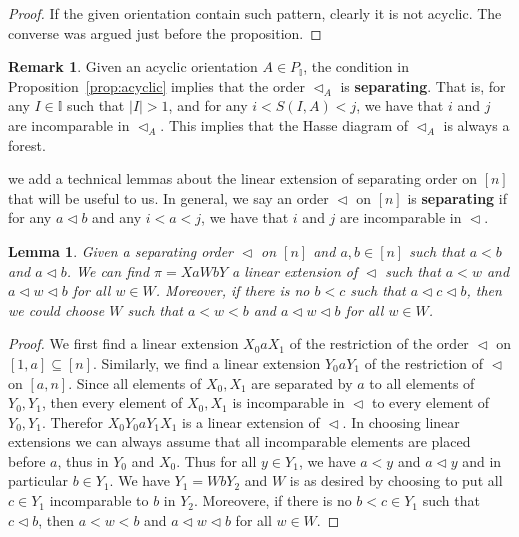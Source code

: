 \documentclass[reqno]{amsart}
\newtheorem{lemma}[theorem]{Lemma}
\theoremstyle{definition}
\newtheorem{remark}[theorem]{Remark}
\newcommand{\defn}[1]{\textbf{\textsf{\color{PineGreen} #1}}} %
\newcommand{\less}{\vartriangleleft} %
\newcommand{\II}{\mathbb I} %
\begin{document}
\begin{proof}
If the given orientation contain such pattern, clearly it is not acyclic. The converse was argued just before the proposition.
\end{proof}

\begin{remark} \label{rem:separation}
Given an acyclic orientation $A\in P_\II$,  the condition in Proposition~\ref{prop:acyclic} implies that the order $\less_A$ is \defn{separating}. That is, for any $I\in \II$ such that $|I|>1$,
and for any $i<S(I,A)<j$, we have that $i$ and $j$ are incomparable in $\less_A$. This implies that the Hasse diagram of $\less_A$ is always a forest.
\end{remark}

we add a  technical lemmas about  the linear extension of separating order on $[n]$ that will be useful to us. In general, we say an order $\less$ on $[n]$ is \defn{separating} if 
for any $a\less b$ and any $i<a<j$, we have that $i$ and $j$ are incomparable in $\less$.

\begin{lemma} \label{lem:XaWbY}
Given a separating order $\less$ on $[n]$ and  $a,b\in [n]$ such that $a<b$ and $a\less b$. We can find $\pi= XaWbY$ a linear extension of $\less$ such that
$a<w$ and $a\less w\less b$ for all $w\in W$. Moreover, if there is no $b<c$ such that $a\less c\less b$, then we could choose $W$ such that $a<w<b$ and $a\less w\less b$ for all $w\in W$.
\end{lemma}

\begin{proof} We first find a linear extension $X_0aX_1$ of the restriction of the order $\less$ on $[1,a]\subseteq [n]$.
Similarly, we find a linear extension $Y_0aY_1$ of the restriction of $\less$ on $[a,n]$. Since all elements of $X_0,X_1$ are separated by $a$ to all elements of $Y_0,Y_1$,
then every element of $X_0,X_1$ is incomparable in $\less$ to every element of $Y_0,Y_1$. Therefor $X_0Y_0aY_1X_1$ is a linear extension of $\less$.
In choosing linear extensions we can always assume that all incomparable elements  are placed before $a$, thus in $Y_0$ and $X_0$. 
Thus for all $y\in Y_1$, we have $a<y$ and $a\less y$ and in particular $b\in Y_1$. We have $Y_1=WbY_2$ and $W$ is as desired by choosing to put all  $c\in Y_1$ incomparable to $b$ in $Y_2$.
Moreovere, if there is no $b<c\in Y_1$ such that $c\less b$, then  $a<w<b$ and $a\less w\less b$ for all $w\in W$. 
\end{proof}
\end{document}
